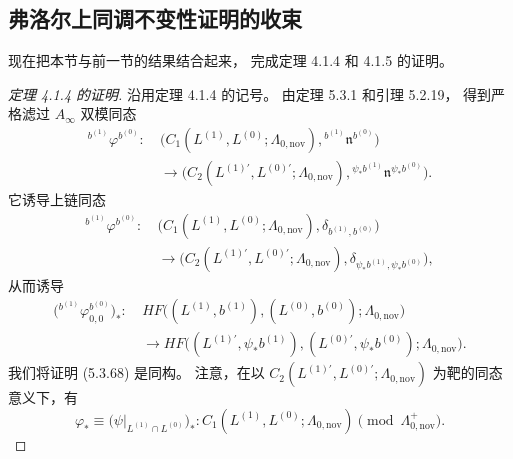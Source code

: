 
\subsection{弗洛尔上同调不变性证明的收束}
\label{subsec:5-3-7}

现在把本节与前一节的结果结合起来，
完成定理 4.1.4 和 4.1.5 的证明。

\begin{proof}[定理 4.1.4 的证明]
沿用定理 4.1.4 的记号。
由定理 5.3.1 和引理 5.2.19，
得到严格滤过 $A_\infty$ 双模同态
\begin{equation}
\begin{aligned}
{}^{b^{(1)}}\varphi^{b^{(0)}}\colon\
&\bigl(
C_1(L^{(1)},L^{(0)};\Lambda_{0,\mathrm{nov}}),
{}^{b^{(1)}}\mathfrak n^{b^{(0)}}
\bigr)\\
&\longrightarrow
\bigl(
C_2(L^{(1)\prime},L^{(0)\prime};
\Lambda_{0,\mathrm{nov}}),
{}^{\psi_*b^{(1)}}\mathfrak n^{\psi_*b^{(0)}}
\bigr).
\end{aligned}
\tag{5.3.66}\label{eq:5-3-66}
\end{equation}
它诱导上链同态
\begin{equation}
\begin{aligned}
{}^{b^{(1)}}\varphi^{b^{(0)}}\colon\
&\bigl(
C_1(L^{(1)},L^{(0)};\Lambda_{0,\mathrm{nov}}),
\delta_{b^{(1)},b^{(0)}}
\bigr)\\
&\longrightarrow
\bigl(
C_2(L^{(1)\prime},L^{(0)\prime};
\Lambda_{0,\mathrm{nov}}),
\delta_{\psi_*b^{(1)},\psi_*b^{(0)}}
\bigr),
\end{aligned}
\tag{5.3.67}\label{eq:5-3-67}
\end{equation}
从而诱导
\begin{equation}
\begin{aligned}
\bigl({}^{b^{(1)}}\varphi^{b^{(0)}}_{0,0}\bigr)_*
\colon\
&HF\bigl((L^{(1)},b^{(1)}),
(L^{(0)},b^{(0)});\Lambda_{0,\mathrm{nov}}\bigr)\\
&\longrightarrow
HF\bigl((L^{(1)\prime},\psi_*b^{(1)}),
(L^{(0)\prime},\psi_*b^{(0)});
\Lambda_{0,\mathrm{nov}}\bigr).
\end{aligned}
\tag{5.3.68}\label{eq:5-3-68}
\end{equation}
我们将证明 (5.3.68) 是同构。
注意，在以
$C_2(L^{(1)\prime},L^{(0)\prime};
\Lambda_{0,\mathrm{nov}})$
为靶的同态意义下，有
\[
\varphi_*
\equiv
\bigl(\psi|_{L^{(1)}\cap L^{(0)}}\bigr)_*
\colon
C_1(L^{(1)},L^{(0)};\Lambda_{0,\mathrm{nov}})
\pmod{\Lambda^+_{0,\mathrm{nov}}}.
\]


\end{proof}
